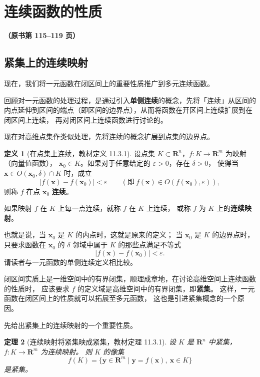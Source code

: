 \documentclass[11pt]{ctexart}
\theoremstyle{plain}
\newtheorem{thm}{定理}[section]
\theoremstyle{definition}
\newtheorem{defn}[thm]{定义}
\theoremstyle{remark}
\newcommand{\srcnum}[1]{\textbf{#1}}
\begin{document}
\newpage

\section{连续函数的性质}

\srcnum{（原书第 115--119 页）}

\subsection{紧集上的连续映射}

现在，我们将一元函数在闭区间上的重要性质推广到多元连续函数。

回顾对一元函数的处理过程，是通过引入\textbf{单侧连续}的概念，先将「连续」从区间的
内点延伸到区间的端点（即区间的边界点），从而将函数在开区间上连续扩展到在闭区间上连续，
再对闭区间上连续函数进行讨论的。

现在对高维点集作类似处理，先将连续的概念扩展到点集的边界点。

\begin{defn}[在点集上连续，教材定义 11.3.1]\label{def:contK}
设点集 \(K\subset\mathbf{R}^n\)，\(f\colon K\to\mathbf{R}^m\) 为映射（向量值函数），
\(\boldsymbol{x}_0\in K\)。如果对于任意给定的 \(\varepsilon>0\)，存在 \(\delta>0\)，
使得当 \(\boldsymbol{x}\in O(\boldsymbol{x}_0,\delta)\cap K\) 时，成立
\[
  |f(\boldsymbol{x})-f(\boldsymbol{x}_0)|<\varepsilon
  \qquad(\text{即}\ f(\boldsymbol{x})\in O(f(\boldsymbol{x}_0),\varepsilon)),
\]
则称 \(f\) 在点 \(\boldsymbol{x}_0\) \textbf{连续}。

如果映射 \(f\) 在 \(K\) 上每一点连续，就称 \(f\) 在 \(K\) 上连续，
或称 \(f\) 为 \(K\) 上的\textbf{连续映射}。
\end{defn}

也就是说，当 \(\boldsymbol{x}_0\) 是 \(K\) 的内点时，这就是原来的定义；
当 \(\boldsymbol{x}_0\) 是 \(K\) 的边界点时，只要求函数在 \(\boldsymbol{x}_0\) 的
\(\delta\) 邻域中属于 \(K\) 的那些点满足不等式
\[
  |f(\boldsymbol{x})-f(\boldsymbol{x}_0)|<\varepsilon .
\]
请读者与一元函数的单侧连续定义相比较。

闭区间实质上是一维空间中的有界闭集，顺理成章地，在讨论高维空间上连续函数的性质时，
应该要求 \(f\) 的定义域是高维空间中的有界闭集，即\textbf{紧集}。
这样，一元函数在闭区间上的性质就可以拓展至多元函数，
这也是引进紧集概念的一个原因。

先给出紧集上的连续映射的一个重要性质。

\begin{thm}[连续映射将紧集映成紧集，教材定理 11.3.1]\label{thm:imagecompact}
设 \(K\) 是 \(\mathbf{R}^n\) 中紧集，\(f\colon K\to\mathbf{R}^m\) 为连续映射。
则 \(K\) 的像集
\[
  f(K)=\{\boldsymbol{y}\in\mathbf{R}^m\mid \boldsymbol{y}=f(\boldsymbol{x}),\ \boldsymbol{x}\in K\}
\]
是紧集。
\end{thm}
\end{document}
